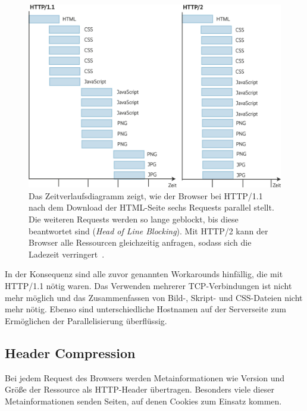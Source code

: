 \documentclass[a4paper, justified, notoc]{tufte-handout} %
\begin{document}
\begin{figure}%
	\centering
  \includegraphics[width=1\textwidth]{./figures/head_of_line_blocking.jpg}
  \caption{Das Zeitverlaufsdiagramm zeigt, wie der Browser bei HTTP/1.1 nach dem Download der HTML-Seite sechs Requests parallel stellt. Die weiteren Requests werden so lange geblockt, bis diese beantwortet sind (\emph{Head of Line Blocking}). Mit HTTP/2 kann der Browser alle Ressourcen gleichzeitig anfragen, sodass sich die Ladezeit verringert~\citep{heise:2018}.}
  \label{fig:head_of_line_blocking}
\end{figure}

In der Konsequenz sind alle zuvor genannten Workarounds hinfällig, die mit HTTP/1.1 nötig waren. Das Verwenden mehrerer TCP-Verbindungen ist nicht mehr möglich und das Zusammenfassen von Bild-, Skript- und CSS-Dateien nicht mehr nötig. Ebenso sind unterschiedliche Hostnamen auf der Serverseite zum Ermöglichen der Parallelisierung überflüssig.





\subsection{Header Compression} %
\label{sub:header_compression}

Bei jedem Request des Browsers werden Metainformationen wie Version und Größe der Ressource als HTTP-Header übertragen. Besonders viele dieser Metainformationen senden Seiten, auf denen Cookies zum Einsatz kommen.
\end{document}

